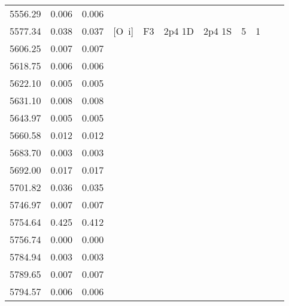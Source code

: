 \begin{longtable}{lrlrlllllll}
 5556.29 &   0.006 &   0.006                                                                                      \\
 5577.34 &   0.038 &   0.037 &  [O~{\sc i}]     &  F3        &  2p4 1D    &  2p4 1S    &          5 &        1    \\
 5606.25 &   0.007 &   0.007                                                                                      \\
 5618.75 &   0.006 &   0.006                                                                                      \\
 5622.10 &   0.005 &   0.005                                                                                      \\
 5631.10 &   0.008 &   0.008                                                                                      \\
 5643.97 &   0.005 &   0.005                                                                                      \\
 5660.58 &   0.012 &   0.012                                                                                      \\
 5683.70 &   0.003 &   0.003                                                                                      \\
 5692.00 &   0.017 &   0.017                                                                                      \\
 5701.82 &   0.036 &   0.035                                                                                      \\
 5746.97 &   0.007 &   0.007                                                                                      \\
 5754.64 &   0.425 &   0.412                                                                                      \\
 5756.74 &   0.000 &   0.000                                                                                      \\
 5784.94 &   0.003 &   0.003                                                                                      \\
 5789.65 &   0.007 &   0.007                                                                                      \\
 5794.57 &   0.006 &   0.006                                                                                      \\

\end{longtable}
